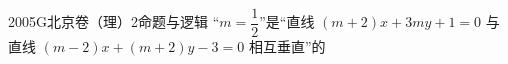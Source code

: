 
\begin{problem}{2005}{G}{北京卷（理）}{2}{命题与逻辑}
“$m=\dfrac{1}{2}$”是“直线 $(m+2)x+3my+1=0$ 与直线 $(m-2)x+(m+2)y-3=0$ 相互垂直”的
\begin{choices}
\end{choices}
\end{problem}

\begin{answer}

\end{answer}

\begin{solutions}

\end{solutions}